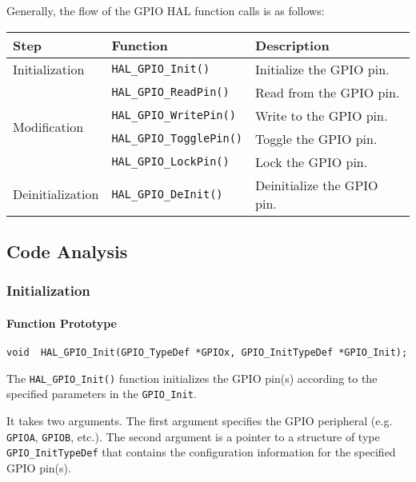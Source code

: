 \documentclass[a4paper,12pt]{article}
\begin{document}
Generally, the flow of the GPIO HAL function calls is as follows:

\begin{table}[H]
    \centering
    \begin{tabular}{lll}
        \toprule
        Step & Function & Description \\
        \midrule
        Initialization & \texttt{HAL\_GPIO\_Init()} & Initialize the GPIO pin. \\
        \midrule
        \multirow{4}{*}{Modification} 
        & \texttt{HAL\_GPIO\_ReadPin()} & Read from the GPIO pin. \\
        & \texttt{HAL\_GPIO\_WritePin()} & Write to the GPIO pin. \\
        & \texttt{HAL\_GPIO\_TogglePin()} & Toggle the GPIO pin. \\
        & \texttt{HAL\_GPIO\_LockPin()} & Lock the GPIO pin. \\
        \midrule
        Deinitialization & \texttt{HAL\_GPIO\_DeInit()} & Deinitialize the GPIO pin. \\
        \bottomrule
    \end{tabular}
\end{table}

\subsection{Code Analysis}

\subsubsection{Initialization}

\paragraph{Function Prototype}

\begin{verbatim}
void  HAL_GPIO_Init(GPIO_TypeDef *GPIOx, GPIO_InitTypeDef *GPIO_Init);
\end{verbatim}

The \texttt{HAL\_GPIO\_Init()} function initializes the GPIO pin(s) according to the specified parameters in the \texttt{GPIO\_Init}.

It takes two arguments. The first argument specifies the GPIO peripheral (e.g. \texttt{GPIOA}, \texttt{GPIOB}, etc.). The second argument is a pointer to a structure of type \texttt{GPIO\_InitTypeDef} that contains the configuration information for the specified GPIO pin(s).
\end{document}
